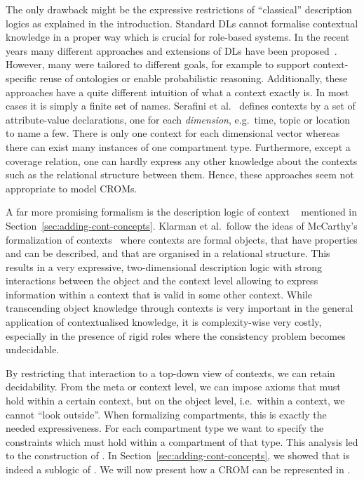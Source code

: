 The only drawback might be the expressive restrictions of ``classical'' description logics as
explained in the introduction. Standard DLs cannot formalise contextual knowledge in a proper way
which is crucial for role-based systems.  In the recent years many different approaches and
extensions of DLs have been proposed~\cite{BoGH-ISWC03, BoGH-WS04, BeAF-ADVIS06, BaVS-ModOnt09, BaKP-JWS12,
  CePe-IJCAR14, CePe-JAR17}.  However, many were tailored to different goals, for example to support
context-specific reuse of ontologies or enable probabilistic reasoning. Additionally, these
approaches have a quite different intuition of what a context exactly is. In most cases it is simply
a finite set of names.  Serafini et al.~\cite{SeHo-JWS12} defines contexts by a set of
attribute-value declarations, one for each \emph{dimension}, e.g.\ time, topic or location to name a
few. There is only one context for each dimensional vector whereas there can exist many instances
of one compartment type.  Furthermore, except a coverage relation, one can hardly express any other
knowledge about the contexts such as the relational structure between them.  Hence, these
approaches seem not appropriate to model CROMs.

A far more promising formalism is the description logic of context \klarALC~\cite{KG-JELIA10, KG16}
mentioned in Section~\ref{sec:adding-cont-concepts}. Klarman et al.\ follow the ideas of McCarthy's
formalization of contexts~\cite{McC-ACM87,McC-IJCAI93} where contexts are formal objects, that have
properties and can be described, and that are organised in a relational structure.  This results in
a very expressive, two-dimensional description logic with strong interactions between the object and
the context level allowing to express information within a context that is valid in some other
context.  While transcending object knowledge through contexts is very important in the general
application of contextualised knowledge, it is complexity-wise very costly, especially in the
presence of rigid roles where the consistency problem becomes undecidable.

By restricting that interaction to a top-down view of contexts, we can retain decidability. From the
meta or context level, we can impose axioms that must hold within a certain context, but on the object
level, i.e.\ within a context, we cannot ``look outside''.
%
When formalizing compartments, this is exactly the needed expressiveness. For each compartment type
we want to specify the constraints which must hold within a compartment of that type.
%
This analysis led to the construction of \LMLO.
In Section~\ref{sec:adding-cont-concepts}, we showed that \ALCALC is indeed a sublogic of \klarALC.
We will now present how a CROM can be represented in \LMLO.

